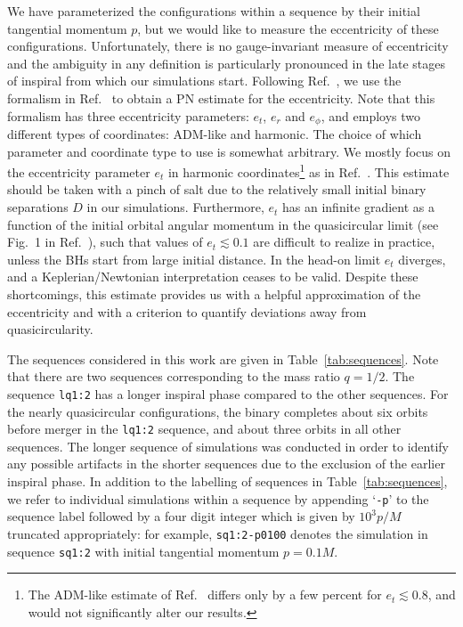 \documentclass[floats,floatfix,showpacs,amssymb,prd,twocolumn,superscriptaddress,nofootinbib,nolongbibliography,reprint]{revtex4-2}
\newcommand{\mr}[1]{{\textcolor{cyan}{\sf{[MR: #1]}} }}
\begin{document}
We have parameterized the configurations within a sequence by their
initial tangential momentum $p$, but we would like to measure the
eccentricity of these configurations. Unfortunately, there is no
gauge-invariant measure of eccentricity~\cite{Loutrel:2018ydu} and the
ambiguity in any definition is particularly pronounced in the late
stages of inspiral from which our simulations start. Following
Ref.~\cite{Sperhake:2007gu}, we use the formalism in
Ref.~\cite{Memmesheimer:2004cv} to obtain a PN estimate for the
eccentricity. Note that this formalism has three eccentricity
parameters: $e_t$, $e_r$ and $e_\phi$, and employs two
different types of coordinates: ADM-like and harmonic. The choice of
which parameter and coordinate type to use is somewhat arbitrary.
We mostly focus on the eccentricity parameter $e_t$ in harmonic coordinates\footnote{
The ADM-like estimate of Ref.~\cite{Memmesheimer:2004cv} differs
only by a few percent for $e_t \lesssim 0.8$, and
would not significantly alter our results.} 
as in Ref.~\cite{Sperhake:2019wwo}. This estimate should be 
taken with a pinch of salt due to the relatively small initial binary 
separations $D$ in our simulations. Furthermore, $e_t$ has an infinite 
gradient as a function of the initial orbital angular momentum
in the quasicircular limit (see Fig.~1 in Ref.~\cite{Sperhake:2007gu}),
such that values of $e_t\lesssim0.1$ are difficult to realize in practice,
unless the BHs start from large initial distance.
In the head-on limit $e_t$ diverges, and a Keplerian/Newtonian
interpretation ceases to be valid. Despite these shortcomings, this 
estimate provides us with a helpful approximation of the eccentricity
and with a criterion to quantify deviations away from quasicircularity.

The sequences considered in this work are given in
Table~\ref{tab:sequences}.  Note that there are two sequences
corresponding to the mass ratio $q=1/2$.  The sequence \texttt{lq1:2}
has a longer inspiral phase compared to the other sequences. For the
nearly quasicircular configurations, the binary completes about six
orbits before merger in the \texttt{lq1:2} sequence, and about three
orbits in all other sequences. The longer sequence of simulations was
conducted in order to identify any possible artifacts in the shorter
sequences due to the exclusion of the earlier inspiral phase. In
addition to the labelling of sequences in Table~\ref{tab:sequences},
we refer to individual simulations within a sequence by appending
`\texttt{-p}' to the sequence label followed by a four digit integer
which is given by $10^3p/M$ truncated appropriately: for example,
\texttt{sq1:2-p0100} denotes the simulation in sequence
\texttt{sq1:2} with initial tangential momentum $p = 0.1M$.
\end{document}
